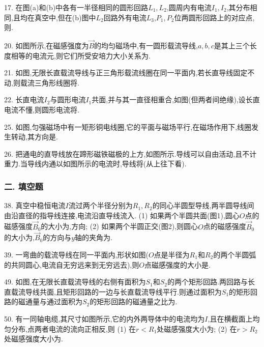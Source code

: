 17. 在图(a)和(b)中各有一半径相同的圆形回路$L_1,L_2$,圆周内有电流$I_1,I_2$,其分布相同,且均在真空中,但在(b)图中$L_2$回路外有电流$L_3$,$P_1,P_2$位两圆形回路上的对应点,则.

20. 如图所示,在磁感强度为$\vec B$的均匀磁场中,有一圆形载流导线,$a,b,c$是其上三个长度相等的电流元,则它们所受安培力大小关系为.

21. 如图,无限长直载流导线与正三角形载流线圈在同一平面内,若长直导线固定不动,则载流三角形线圈将.

22. 长直电流$I_2$与圆形电流$I_1$共面,并与其一直径相重合,如图(但两者间绝缘),设长直电流不懂,则圆形电流将.

25. 如图,匀强磁场中有一矩形铜电线圈,它的平面与磁场平行,在磁场作用下,线圈发生转动,其方向是.

26. 把通电的直导线放在蹄形磁铁磁极的上方,如图所示.导线可以自由活动,且不计重力.当导线内通以如图所示的电流时,导线将(从上往下看).

\subsubsection*{二. 填空题}

38. 真空中稳恒电流$I$流过两个半径分别为$R_1,R_2$的同心半圆型导线,两半圆导线间由沿直径的指导线连接,电流沿直导线流入.
    (1) 如果两个半圆共面(图1),圆心$O$点的磁感强度$\vec B_0$的大小为,方向;
    (2) 如果两个半圆正交(图2),则圆心$O$点的磁感强度$\vec B_0$的大小为,$\vec B_0$的方向与$y$轴的夹角为.

39. 一弯曲的载流导线在同一平面内,形状如图($O$点是半径为$R_1$和$R_2$的两个半圆弧的共同圆心,电流自无穷远来到无穷远去),则$O$点磁感强度的大小是.

49. 如图,在无限长直载流导线的右侧有面积为$S_1$和$S_2$的两个矩形回路.两回路与长直载流导线共面,且矩形回路的一边与长直载流导线平行.则通过面积为$S_1$的矩形回路的磁通量与通过面积为$S_2$的矩形回路的磁通量之比为.

50. 有一同轴电缆,其尺寸如图所示,它的内外两导体中的电流均为$I$,且在横截面上均匀分布,点两者电流的流向正相反,则
    (1) 在$r<R_1$处磁感强度大小为;
    (2) 在$r>R_2$处磁感强度大小为.

